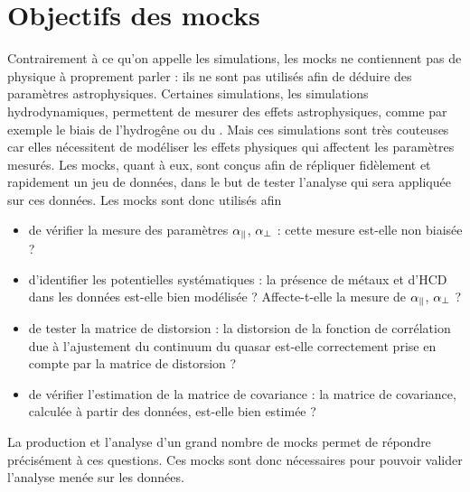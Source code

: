 \documentclass[11pt, twoside, a4paper, openright]{report}
\begin{document}
\section{Objectifs des mocks}
Contrairement à ce qu'on appelle les simulations, les mocks ne contiennent pas de physique à proprement parler : ils ne sont pas utilisés afin de déduire des paramètres astrophysiques. Certaines simulations, les simulations hydrodynamiques, permettent de mesurer des effets astrophysiques, comme par exemple le biais de l'hydrogêne ou du \lya{}. Mais ces simulations sont très couteuses car elles nécessitent de modéliser les effets physiques qui affectent les paramètres mesurés.
Les mocks, quant à eux, sont conçus afin de répliquer fidèlement et rapidement un jeu de données, dans le but de tester l'analyse qui sera appliquée sur ces données.
Les mocks sont donc utilisés afin
\begin{itemize}[label=$\bullet$]
\item de vérifier la mesure des paramètres $\alpha_{\parallel}{}$, $\alpha_{\perp}{}$ : cette mesure est-elle non biaisée ?
\item d'identifier les potentielles systématiques : la présence de métaux et d'HCD dans les données est-elle bien modélisée ? Affecte-t-elle la mesure de $\alpha_{\parallel}{}$, $\alpha_{\perp}{}$ ?
\item de tester la matrice de distorsion : la distorsion de la fonction de corrélation due à l'ajustement du continuum du quasar est-elle correctement prise en compte par la matrice de distorsion ?
\item de vérifier l'estimation de la matrice de covariance : la matrice de covariance, calculée à partir des données, est-elle bien estimée ?
\end{itemize}
La production et l'analyse d'un grand nombre de mocks permet de répondre précisément à ces questions. Ces mocks sont donc nécessaires pour pouvoir valider l'analyse menée sur les données.
\end{document}

